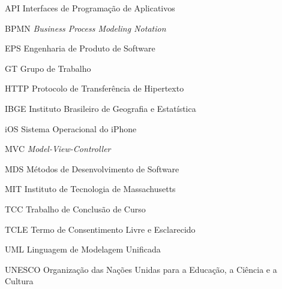 \begin{siglas}
  \item[API] Interfaces de Programação de Aplicativos
  \item[BPMN] \textit{Business Process Modeling Notation}
  \item[EPS] Engenharia de Produto de Software
  \item[GT] Grupo de Trabalho
  \item[HTTP] Protocolo de Transferência de Hipertexto 
  \item[IBGE] Instituto Brasileiro de Geografia e Estatística
  \item[iOS] Sistema Operacional do iPhone 
  \item[MVC] \textit{Model-View-Controller}
  \item[MDS] Métodos de Desenvolvimento de Software
  \item[MIT] Instituto de Tecnologia de Massachusetts
  \item[TCC] Trabalho de Conclusão de Curso 
  \item[TCLE] Termo de Consentimento Livre e Esclarecido 
  \item[UML] Linguagem de Modelagem Unificada
  \item[UNESCO] Organização das Nações Unidas para a Educação, a Ciência e a Cultura
\end{siglas}
